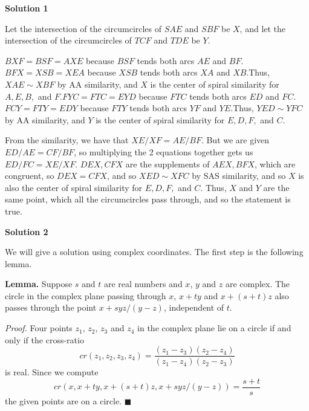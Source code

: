 \begin{enumerate}
 



\textbf{Solution 1}

Let the intersection of the circumcircles of $SAE$ and $SBF$ be $X$, and let the intersection of the circumcircles of $TCF$ and $TDE$ be $Y$.

 $BXF=BSF=AXE$ because $BSF$ tends both arcs $AE$ and $BF$.$BFX=XSB=XEA$ because $XSB$ tends both arcs $XA$ and $XB$.Thus, $XAE\sim XBF$ by AA similarity, and $X$ is the center of spiral similarity for $A,E,B,$ and $F$.$FYC=FTC=EYD$ because $FTC$ tends both arcs $ED$ and $FC$.$FCY=FTY=EDY$ because $FTY$ tends both arcs $YF$ and $YE$.Thus, $YED\sim YFC$ by AA similarity, and $Y$ is the center of spiral similarity for $E,D,F,$ and $C$.

 From the similarity, we have that $XE/XF=AE/BF$. But we are given $ED/AE=CF/BF$, so multiplying the 2 equations together gets us $ED/FC=XE/XF$. $DEX,CFX$ are the supplements of $AEX, BFX$, which are congruent, so $DEX=CFX$, and so $XED\sim XFC$ by SAS similarity, and so $X$ is also the center of spiral similarity for $E,D,F,$ and $C$. Thus, $X$ and $Y$ are the same point, which all the circumcircles pass through, and so the statement is true.

 



\textbf{Solution 2}

We will give a solution using complex coordinates. The first step is the following lemma.

 \textbf{Lemma.} Suppose $s$ and $t$ are real numbers and $x$, $y$ and $z$ are complex. The circle in the complex plane passing through $x$, $x + ty$ and $x + (s + t)z$ also passes through the point $x + syz/(y - z)$, independent of $t$.

 \textit{Proof.} Four points $z_1$, $z_2$, $z_3$ and $z_4$ in the complex plane lie on a circle if and only if the cross-ratio
 \[cr(z_1, z_2, z_3, z_4) = \frac{(z_1 - z_3)(z_2 - z_4)}{(z_1 - z_4)(z_2 - z_3)}\]is real. Since we compute
 \[cr(x, x + ty, x + (s + t)z, x + syz/(y - z)) = \frac{s + t}{s}\]the given points are on a circle. $\blacksquare$


\end{enumerate}

